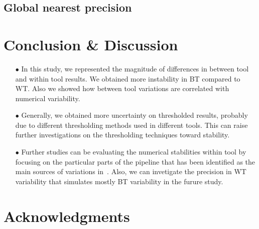 \documentclass[conference]{IEEEtran}
\begin{document}
\subsection{Global nearest precision}

  
\section{Conclusion \& Discussion}


\begin{itemize}
    \item[$\bullet$ ] In this study, we represented the magnitude of differences in between tool and within tool results.
    We obtained more instability in BT compared to WT. Also we showed how between tool variations
    are correlated with numerical variability.

    \item[$\bullet$ ] Generally, we obtained more uncertainty on thresholded results, probably due to different thresholding
    methods used in different tools. This can raise further investigations on the thresholding techniques toward stability.

    \item[$\bullet$ ] Further studies can be evaluating the numerical stabilities within tool by focusing on the particular parts of
    the pipeline that has been identified as the main sources of variations in~\cite{bowring2021isolating}.
    Also, we can invetigate the precision in WT variability that simulates mostly BT variability in the furure study.

\end{itemize}


\section{Acknowledgments}




\end{document}
